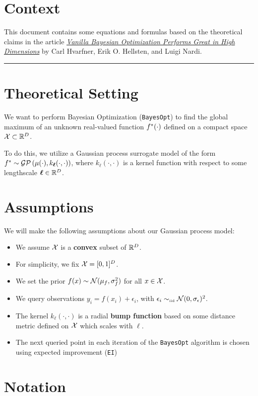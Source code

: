 \documentclass[11pt]{article}
\numberwithin{figure}{section}
\numberwithin{equation}{section}
\newcommand{\bs}[1]{\boldsymbol{#1}}
\def\bell{\bs{\ell}}
\def\BayesOpt{\texttt{BayesOpt}}
\def\EI{\texttt{EI}}
\def\calGP{\mathcal{GP}}
\begin{document}
\section{Context}

This document contains some equations and formulas based on the theoretical claims in the article \href{https://arxiv.org/abs/2402.02229}{\textit{Vanilla Bayesian Optimization Performs Great in High Dimensions}} by Carl Hvarfner, Erik O. Hellsten, and Luigi Nardi.

\noindent\rule{\textwidth}{0.8pt}

\section{Theoretical Setting}

We want to perform Bayesian Optimization (\BayesOpt{}) to find the global maximum of an unknown real-valued function $f^{*}(\cdot)$ defined on a compact space $\mathcal{X} \subset \mathbb{R}^{D}$.

To do this, we utilize a Gaussian process surrogate model of the form $\fstar \sim \calGP\left(\mu(\cdot), k_{\bell}(\cdot, \cdot)\right)$, where $k_{\bell}(\cdot, \cdot)$ is a kernel function with respect to some lengthscale $\bell \in \bbR^{D}$.

\section{Assumptions}

We will make the following assumptions about our Gaussian process model:

\begin{itemize}[label=]
  \item We assume $\mathcal{X}$ is a \textbf{convex} subset of $\mathbb{R}^{D}$.
  \item For simplicity, we fix $\mathcal{X} = [0, 1]^{D}$.
  \item We set the prior $f(x) \sim \mathcal{N}(\mu_{f}, \sigma_{f}^{2})$ for all $x \in \mathcal{X}$.
  \item We query observations $y_{i} = f(x_{i}) + \epsilon_{i}$, with $\epsilon_{i} \sim_{\mbox{\tiny \textrm{iid}}} \mathcal{N}(0, \sigma_{\epsilon})^{2}$.
  \item The kernel $k_{\bell}(\cdot, \cdot)$ is a radial \textbf{bump function} based on some distance metric defined on $\mathcal{X}$ which scales with $\bell$. 
  \item The next queried point in each iteration of the \BayesOpt{} algorithm is chosen using expected improvement (\EI{})
\end{itemize}
 
\section{Notation}
\end{document}
